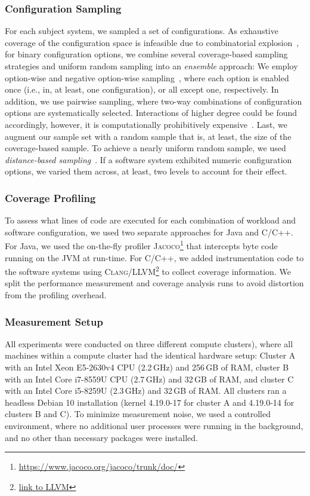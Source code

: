 \subsubsection{Configuration Sampling}\label{sec:sampling}
For each subject system, we sampled a set of configurations. As exhaustive coverage of the configuration space is infeasible due to combinatorial explosion~\cite{henardCombining2015}, for binary configuration options, we combine several coverage-based sampling strategies and uniform random sampling into an \emph{ensemble} approach: 
We employ option-wise and negative option-wise sampling~\cite{siegmundPerformanceinfluenceModelsHighly2015}, where each option is enabled once (i.e., in, at least, one configuration), or all except one, respectively. In addition, we use pairwise sampling, where two-way combinations of configuration options are systematically selected. Interactions of higher degree could be found accordingly, however, it is computationally prohibitively expensive~\cite{henardCombining2015}. 
Last, we augment our sample set with a random sample that is, at least, the size of the coverage-based sample. To achieve a nearly uniform random sample, we used \emph{distance-based sampling}~\cite{kaltenecker_distance-based_2019}. If a software system exhibited numeric configuration options, we varied them across, at least, two levels to account for their effect. %


\subsubsection{Coverage Profiling}\label{sec:profiling}
To assess what lines of code are executed for each combination of workload and software configuration, we used two separate approaches for Java and C/C++. For Java, we used the on-the-fly profiler \textsc{Jacoco}\footnote{\url{https://www.jacoco.org/jacoco/trunk/doc/}} that intercepts byte code running on the JVM at run-time. For C/C++, we added instrumentation code to the software systems using \textsc{Clang/LLVM}\footnote{\url{link to LLVM}} to collect coverage information. We split the performance measurement and coverage analysis runs to  avoid distortion from the profiling overhead.

	
\subsubsection{Measurement Setup}\label{sec:measurement_setup}
All experiments were conducted on three different compute clusters), where all machines within a compute cluster had the identical hardware setup: Cluster \textsf{A} with an Intel Xeon E5-2630v4 CPU (2.2\,GHz) and 256\,GB of RAM, cluster \textsf{B}  with an Intel Core i7-8559U CPU (2.7\,GHz) and 32\,GB of RAM, and cluster \textsf{C} with an Intel Core i5-8259U (2.3\,GHz) and 32\,GB of RAM. All clusters ran a headless Debian 10 installation (kernel 4.19.0-17 for cluster \textsf{A} and 4.19.0-14 for clusters \textsf{B} and \textsf{C}). To minimize measurement noise, we used a controlled environment, where no additional user processes were running in the background, and no other than necessary packages were installed. 

